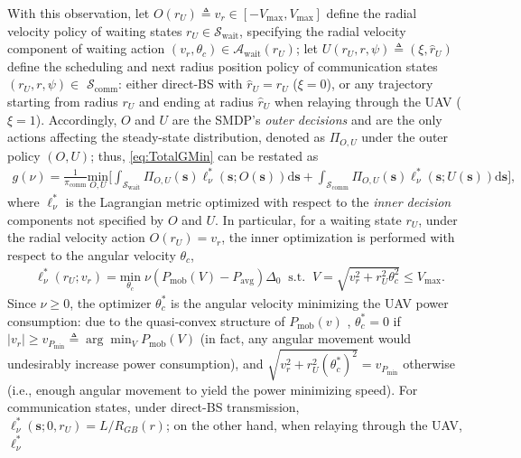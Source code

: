 \documentclass[12pt, draftcls, onecolumn]{IEEEtran}
\theoremstyle{plain}
\theoremstyle{definition}
\theoremstyle{remark}
\begin{document}
With this observation, let $O(r_U){\triangleq}v_{r}{\in}[-V_{\mathrm{max}},V_{\mathrm{max}}]$ define the radial velocity policy of waiting states $r_U{\in}\mathcal{S}_{\mathrm{wait}}$, specifying the radial velocity component of waiting action $(v_r,\theta_c){\in}\mathcal{A}_{\mathrm{wait}}(r_U)$; 
let $U(r_U,r,\psi){\triangleq}(\xi,\hat{r}_{U})$ define the scheduling and next radius position policy of communication states $(r_U,r,\psi){\in}$ $\mathcal{S}_{\mathrm{comm}}$:
either direct-BS with $\hat r_U=r_U$ ($\xi=0$), or any trajectory
starting from radius $r_U$ and ending at radius $\hat r_U$ when relaying through the UAV ($\xi=1$). Accordingly, $O$ and $U$ are the SMDP's \emph{outer decisions} and are the only actions affecting the steady-state distribution, denoted as $\Pi_{O,U}$ under the outer policy $(O,U)$; thus, \eqref{eq:TotalGMin} can be restated as
\begin{align}\label{eq:PolDecomp}
	g(\nu) = \frac{1}{\pi_{\mathrm{comm}}} \underset{O,U}{\mathrm{min}} \Bigr[ \int_{\mathcal{S}_{\mathrm{wait}}} \Pi_{O,U}(\mathbf{s}) \ell_{\nu}^{*}(\mathbf{s}; O(\mathbf{s}))\mathrm{d}\mathbf{s} + \int_{\mathcal{S}_{\mathrm{comm}}} \Pi_{O,U}(\mathbf{s}) \ell_{\nu}^{*}(\mathbf{s}; U(\mathbf{s})) \mathrm{d}\mathbf{s} \Bigr],
\end{align}
where $\ell_{\nu}^{*}$ is the Lagrangian metric optimized with respect to the \emph{inner decision} components not specified by $O$ and $U$. In particular, for a waiting state $r_{U}$, under the radial velocity action $O(r_U){=}v_{r}$, the inner optimization is performed with respect to the angular velocity $\theta_{c}$,\pagebreak
\begin{align}\label{eq:MinLWP}
	&\ell_{\nu}^{*}(r_U; v_r) = \underset{\theta_c}{\mathrm{min}}\; \nu \left( P_{\mathrm{mob}}(V) - P_{\mathrm{avg}} \right)\Delta_0 \;\; \mathrm{s.t.}\;\; V=\sqrt{v_{r}^{2} + r_U^2\theta_c^2} \leq V_{\mathrm{max}}.
\end{align}
Since $\nu{\geq}0$, the optimizer $\theta_{c}^{*}$ is the angular velocity minimizing the UAV power consumption: due to the quasi-convex structure of $P_{\mathrm{mob}}(v)$ \cite{SCA}, $\theta_{c}^{*}{=}0$ if $|v_r|{\geq}v_{P_{\mathrm{min}}}{\triangleq}\arg\min_V P_{\mathrm{mob}}(V)$ (in fact, any angular movement would undesirably increase power consumption), and $\sqrt{v_{r}^{2}{+}r_{U}^{2}(\theta_{c}^{*})^{2}}{=}v_{P_{\mathrm{min}}}$ otherwise (i.e., enough angular movement to yield the power minimizing speed). For communication states, under direct-BS transmission,
 $\ell_{\nu}^{*}(\mathbf{s};0,r_U)=L/R_{GB}(r)$; on the other hand, when relaying through the UAV, $\ell_{\nu}^{*}$
\end{document}
